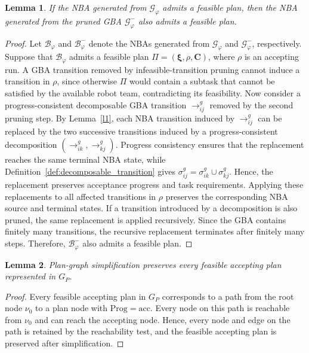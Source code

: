 \documentclass[lettersize,journal]{IEEEtran}
\theoremstyle{italiclemma}
\newtheorem{lemma}{Lemma}
\theoremstyle{italiclemma}
\theoremstyle{definition}
\begin{document}
\begin{lemma}\label{l3}
If the NBA generated from $\mathcal{G}_{\varphi}$ admits a feasible plan, then the NBA generated from the pruned GBA $\mathcal{G}_{\varphi}^{-}$ also admits a feasible plan.
\end{lemma}
\begin{proof}
Let $\mathcal{B}_{\varphi}$ and $\mathcal{B}_{\varphi}^{-}$ denote the NBAs generated from $\mathcal{G}_{\varphi}$ and $\mathcal{G}_{\varphi}^{-}$, respectively. Suppose that
$\mathcal{B}_{\varphi}$ admits a feasible plan
$\Pi=(\boldsymbol{\xi},\rho,\mathbf{C})$, where $\rho$ is an accepting run.  A GBA transition removed by infeasible-transition pruning cannot induce
a transition in $\rho$, since otherwise $\Pi$ would contain a subtask that cannot be satisfied by the available robot team, contradicting its feasibility. Now consider a progress-consistent decomposable GBA transition
$\rightarrow^g_{ij}$ removed by the second pruning step. By
Lemma~\ref{l1}, each NBA transition induced by $\rightarrow^g_{ij}$ can be replaced by the two successive transitions induced by a progress-consistent decomposition
$(\rightarrow^g_{ik},\rightarrow^g_{kj})$. Progress consistency ensures that the replacement reaches the same terminal NBA state, while Definition~\ref{def:decomposable_transition} gives $\sigma^g_{ij}=\sigma^g_{ik}\cup\sigma^g_{kj}$. Hence, the replacement preserves acceptance progress and task requirements. Applying these replacements to all affected transitions in $\rho$ preserves the corresponding NBA source and terminal states. If a transition introduced by a decomposition is also pruned, the same replacement is applied recursively. Since the GBA contains finitely many transitions, the recursive replacement terminates after finitely many steps. Therefore, $\mathcal{B}_{\varphi}^{-}$ also admits a feasible plan.
\end{proof}

\begin{lemma}\label{lem:plan-graph-simplification}
Plan-graph simplification preserves every feasible accepting plan represented in \(G_P\).
\end{lemma}
\begin{proof}
Every feasible accepting plan in \(G_P\) corresponds to a path from the root node \(\nu_0\) to a plan node with
\(\mathrm{Prog}=\mathrm{acc}\). Every node on this path is reachable from \(\nu_0\) and can reach the accepting node. Hence, every node and edge on the path is retained by the reachability test, and the feasible accepting plan is preserved after simplification.
\end{proof}
\end{document}
